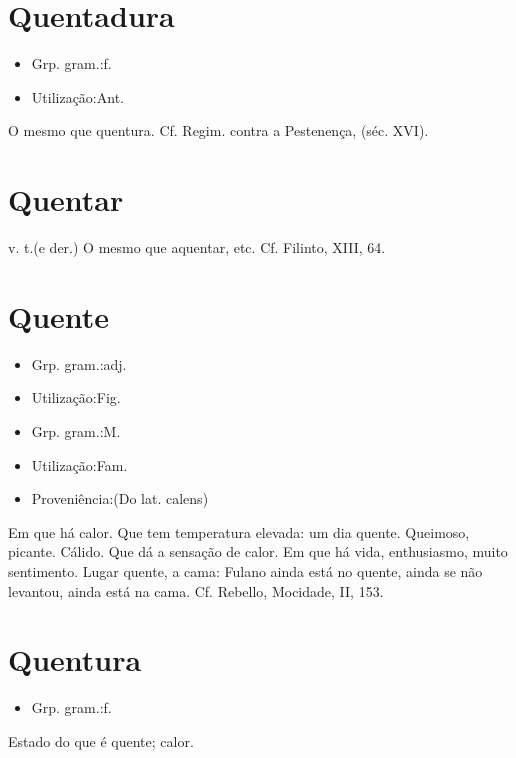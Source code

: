 \section{Quentadura}
\begin{itemize}
\item {Grp. gram.:f.}
\end{itemize}
\begin{itemize}
\item {Utilização:Ant.}
\end{itemize}
O mesmo que \textunderscore quentura\textunderscore . Cf. \textunderscore Regim. contra a Pestenença\textunderscore , (séc. XVI).
\section{Quentar}
\textunderscore v. t.\textunderscore  (e der.)
O mesmo que \textunderscore aquentar\textunderscore , etc. Cf. Filinto, XIII, 64.
\section{Quente}
\begin{itemize}
\item {Grp. gram.:adj.}
\end{itemize}
\begin{itemize}
\item {Utilização:Fig.}
\end{itemize}
\begin{itemize}
\item {Grp. gram.:M.}
\end{itemize}
\begin{itemize}
\item {Utilização:Fam.}
\end{itemize}
\begin{itemize}
\item {Proveniência:(Do lat. \textunderscore calens\textunderscore )}
\end{itemize}
Em que há calor.
Que tem temperatura elevada: \textunderscore um dia quente\textunderscore .
Queimoso, picante.
Cálido.
Que dá a sensação de calor.
Em que há vida, enthusiasmo, muito sentimento.
Lugar quente, a cama: \textunderscore Fulano ainda está no quente\textunderscore , ainda se não levantou, ainda está na cama. Cf. Rebello, \textunderscore Mocidade\textunderscore , II, 153.
\section{Quentura}
\begin{itemize}
\item {Grp. gram.:f.}
\end{itemize}
Estado do que é quente; calor.
